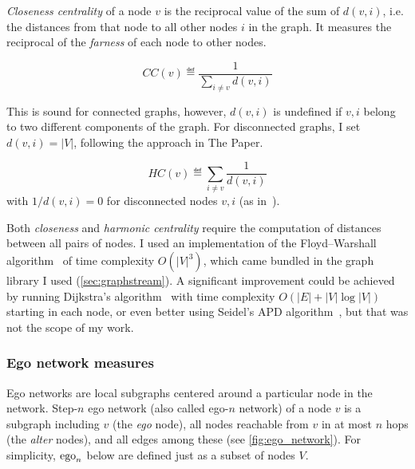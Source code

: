 \textsl{Closeness centrality} of a node $v$ is the reciprocal value of the sum of $d(v, i)$, i.e. the distances from that node to all other nodes $i$ in the graph.
It measures the reciprocal of the \textsl{farness} of each node to other nodes.
\begin{definition}
    \label{def:closeness_centrality}
    \vspace*{-5mm}
    \[CC(v) \eqdef \frac{1}{\sum_{i \neq v} d(v, i)}\]
\end{definition}

This is sound for connected graphs, however, $d(v, i)$ is undefined if $v, i$ belong to two different components of the graph.
For disconnected graphs, I set $d(v, i) = \left\lvert V \right\rvert$, following the approach in The Paper.



\begin{definition}
    \label{def:harmonic_centrality}
    \vspace*{-5mm}
    \[HC(v) \eqdef \sum_{i \neq v} \frac{1}{d(v, i)}\]
    with $1 / d(v, i) = 0$ for disconnected nodes $v, i$ (as in~\cite{MarchioriHarmonySmallworld2000}).
\end{definition}

Both \textsl{closeness} and \textsl{harmonic centrality} require the computation of distances between all pairs of nodes.
I used an implementation of the Floyd–Warshall algorithm~\cite{FloydAlgorithm97Shortest1962} of time complexity $O({\left\lvert V \right\rvert}^3)$, which came bundled in the graph library I used (\cref{sec:graphstream}).
A significant improvement could be achieved by running Dijkstra's algorithm~\cite{dijkstra1959note} with time complexity $O(\left\lvert E \right\rvert + \left\lvert V \right\rvert \log \left\lvert V \right\rvert )$ starting in each node, or even better using Seidel's APD algorithm~\cite{SeidelAllPairsShortestPathProblemUnweighted1995}, but that was not the scope of my work.

\subsubsection*{Ego network measures}

Ego networks are local subgraphs centered around a particular node in the network.
Step-$n$ ego network (also called ego-$n$ network) of a node $v$ is a subgraph including $v$ (the \textsl{ego} node), all nodes reachable from $v$ in at most $n$ hops (the \textsl{alter} nodes), and all edges among these (see \autoref{fig:ego_network}).
For simplicity, $\operatorname{ego}_n$ below are defined just as a subset of nodes $V$.

